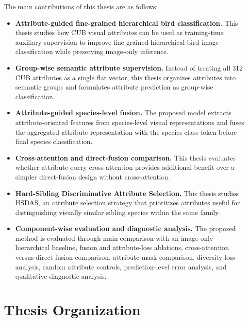 The main contributions of this thesis are as follows:

\begin{itemize}
    \item \textbf{Attribute-guided fine-grained hierarchical bird classification.}
    This thesis studies how CUB visual attributes can be used as training-time auxiliary supervision to improve fine-grained hierarchical bird image classification while preserving image-only inference.

    \item \textbf{Group-wise semantic attribute supervision.}
    Instead of treating all 312 CUB attributes as a single flat vector, this thesis organizes attributes into semantic groups and formulates attribute prediction as group-wise classification.

    \item \textbf{Attribute-guided species-level fusion.}
    The proposed model extracts attribute-oriented features from species-level visual representations and fuses the aggregated attribute representation with the species class token before final species classification.

    \item \textbf{Cross-attention and direct-fusion comparison.}
    This thesis evaluates whether attribute-query cross-attention provides additional benefit over a simpler direct-fusion design without cross-attention.

    \item \textbf{Hard-Sibling Discriminative Attribute Selection.}
    This thesis studies HSDAS, an attribute selection strategy that prioritizes attributes useful for distinguishing visually similar sibling species within the same family.

    \item \textbf{Component-wise evaluation and diagnostic analysis.}
    The proposed method is evaluated through main comparison with an image-only hierarchical baseline, fusion and attribute-loss ablations, cross-attention versus direct-fusion comparison, attribute mask comparison, diversity-loss analysis, random attribute controls, prediction-level error analysis, and qualitative diagnostic analysis.
\end{itemize}






\section{Thesis Organization}

